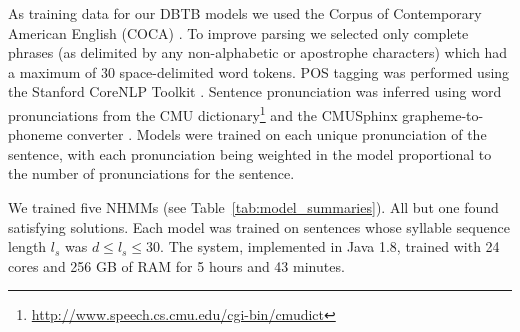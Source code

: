 \documentclass[phd,electronic,oneside,twosidetoc,letterpaper,chaptercenter,parttop,lof,lot]{byumsphd}
\begin{document}




As training data for our DBTB models we used the Corpus of Contemporary American English (COCA) \cite{davies2009385+}. To improve parsing we selected only complete phrases (as delimited by any non-alphabetic or apostrophe characters) which had a maximum of 30 space-delimited word tokens. POS tagging was performed using the Stanford CoreNLP Toolkit \cite{Manning2014}. Sentence pronunciation was inferred using word pronunciations from the CMU dictionary\footnote{\url{http://www.speech.cs.cmu.edu/cgi-bin/cmudict}} and the CMUSphinx grapheme-to-phoneme converter \cite{Walker2004}. Models were trained on each unique pronunciation of the sentence, with each pronunciation being weighted in the model proportional to the number of pronunciations for the sentence.

We trained five NHMMs (see Table~\ref{tab:model_summaries}). All but one found satisfying solutions. Each model was trained on sentences whose syllable sequence length $l_s$ was $d \leq l_s \leq 30$. The system, implemented in Java 1.8, trained with 24 cores and 256 GB of RAM for 5 hours and 43 minutes.
\end{document}
